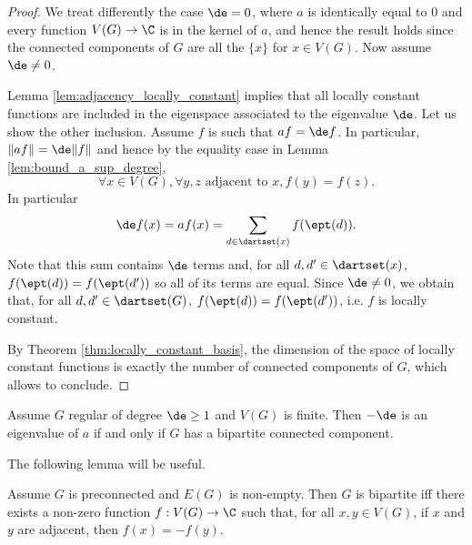 \begin{proof}
  We treat differently the case $\de=0$, where $a$ is identically equal to $0$
  and every function $V(G) \rightarrow \C$ is in the kernel of $a$, and
  hence the result holds since the connected components of $G$ are all the
  $\{x\}$ for $x \in V(G)$. Now assume $\de \neq 0$.

  Lemma \ref{lem:adjacency_locally_constant} implies that all locally constant
  functions are included in the eigenspace associated to the eigenvalue $\de$.
  Let us show the other inclusion.
  Assume $f$ is such that $af=\de f$. In particular, $\|af\|=\de\|f\|$ and hence
  by the equality case in Lemma \ref{lem:bound_a_sup_degree},
  \begin{equation*}
    \forall x \in V(G), \forall y, z \text{ adjacent to } x,
    f(y)=f(z).
  \end{equation*}
  In particular
  \begin{equation*}
    \de f(x) = af(x) = \sum_{d \in \dartset(x)} f(\ept(d)).
  \end{equation*}
  Note that this sum contains $\de$ terms and,
   for all $d,d' \in \dartset(x)$, $f(\ept(d))=f(\ept(d'))$
  so all of its terms are equal.
  Since $\de \neq 0$, we obtain
  that, for all $d, d' \in \dartset(G)$, $f(\ept(d))=f(\ept(d'))$,
  i.e. $f$ is locally constant.

  By Theorem \ref{thm:locally_constant_basis},
  the dimension of the space of locally constant functions
   is exactly the number of connected components of $G$,
  which allows to conclude.
\end{proof}

\begin{proposition}
  \label{prop:eigenvalue_regular_bipartite}
  Assume $G$ regular of degree $\de \geq 1$ and $V(G)$ is finite. Then
  $-\de$ is an eigenvalue of $a$ if and only if $G$ has a bipartite connected
  component.
\end{proposition}

The following lemma will be useful.

\begin{lemma}
  \label{lem:bipartite_odd_function}
  Assume $G$ is preconnected and $E(G)$ is non-empty. Then
  $G$ is bipartite iff there exists a non-zero function
  $f : V(G) \rightarrow \C$
  such that, for all $x, y \in V(G)$,
  if $x$ and $y$ are adjacent, then $f(x)=-f(y)$.
\end{lemma}

